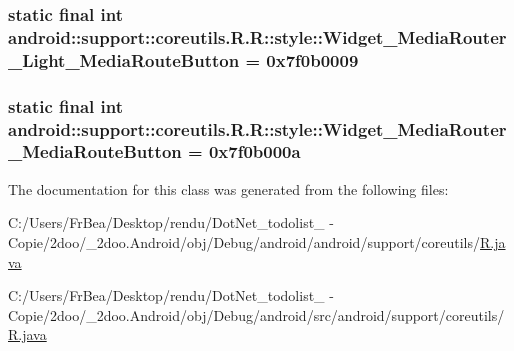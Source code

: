 \hypertarget{classandroid_1_1support_1_1coreutils_1_1_r_1_1style_90c9239117b9fa0357f008ae8aab9684}{
\subsubsection[{Widget\_\-MediaRouter\_\-Light\_\-MediaRouteButton}]{\setlength{\rightskip}{0pt plus 5cm}static final int android::support::coreutils.R.R::style::Widget\_\-MediaRouter\_\-Light\_\-MediaRouteButton = 0x7f0b0009}}
\label{classandroid_1_1support_1_1coreutils_1_1_r_1_1style_90c9239117b9fa0357f008ae8aab9684}


\hypertarget{classandroid_1_1support_1_1coreutils_1_1_r_1_1style_24dcb6218a56d1666e1844766e5b8180}{
\subsubsection[{Widget\_\-MediaRouter\_\-MediaRouteButton}]{\setlength{\rightskip}{0pt plus 5cm}static final int android::support::coreutils.R.R::style::Widget\_\-MediaRouter\_\-MediaRouteButton = 0x7f0b000a}}
\label{classandroid_1_1support_1_1coreutils_1_1_r_1_1style_24dcb6218a56d1666e1844766e5b8180}




The documentation for this class was generated from the following files:\begin{CompactItemize}
\item 
C:/Users/FrBea/Desktop/rendu/DotNet\_\-todolist\_ - Copie/2doo/\_\-2doo.Android/obj/Debug/android/android/support/coreutils/\hyperlink{android_2support_2coreutils_2_r_8java}{R.java}\item 
C:/Users/FrBea/Desktop/rendu/DotNet\_\-todolist\_ - Copie/2doo/\_\-2doo.Android/obj/Debug/android/src/android/support/coreutils/\hyperlink{src_2android_2support_2coreutils_2_r_8java}{R.java}\end{CompactItemize}
